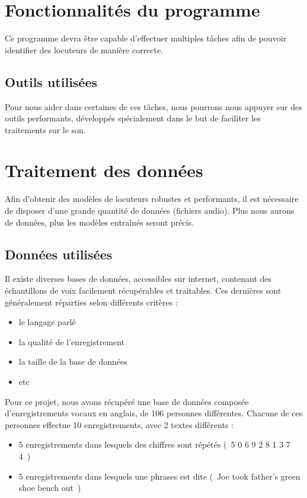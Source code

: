 \documentclass[a4paper, 12pt]{book}
\newcounter{program}[subsection]
\begin{document}
\section{Fonctionnalités du programme}

Ce programme devra être capable d'effectuer multiples tâches afin de pouvoir identifier des locuteurs de manière correcte.

\subsection{Outils utilisées}

Pour nous aider dans certaines de ces tâches, nous pourrons nous appuyer sur des outils performants, développés spécialement dans le but de faciliter les traitements sur le son.
\section{Traitement des données}

Afin d'obtenir des modèles de locuteurs robustes et performants, il est nécessaire de disposer d'une grande quantité de données (fichiers audio). Plus nous aurons de données, plus les modèles entraînés seront précis.  

\subsection{Données utilisées\label{data-split}}

Il existe diverses bases de données, accessibles sur internet, contenant des échantillons de voix facilement récupérables et traitables. Ces dernières sont généralement réparties selon différents critères :
\begin{itemize}
  \item le langage parlé
  \item la qualité de l'enregistrement
  \item la taille de la base de données
  \item etc
\end{itemize}

Pour ce projet, nous avons récupéré une base de données composée d'enregistrements vocaux en anglais, de 106 personnes différentes. Chacune de ces personnes effectue 10 enregistrements, avec 2 textes différents :
\begin{itemize}
  \item 5 enregistrements dans lesquels des chiffres sont répétés (\guillemotleft{}~5 0 6 9 2 8 1 3 7 4~\guillemotright{})
  \item 5 enregistrements dans lesquels une phrases est dite (\guillemotleft{}~Joe took father's green shoe bench out~\guillemotright{})
\end{itemize}
\end{document}
